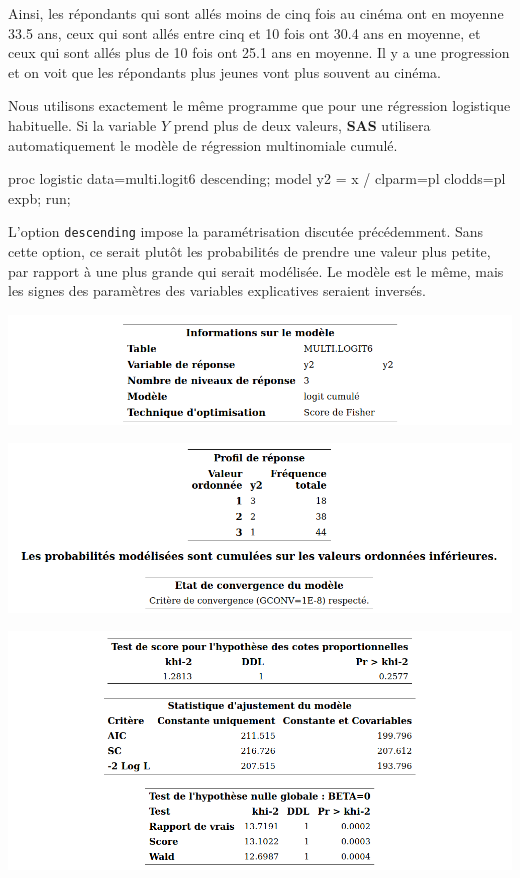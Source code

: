 \documentclass[
  11pt,
  letterpaper,
]{book}
\newenvironment{Shaded}{\begin{snugshade}}{\end{snugshade}}
\newcommand{\NormalTok}[1]{#1}
\theoremstyle{definition}
\theoremstyle{definition}
\theoremstyle{definition}
\theoremstyle{definition}
\theoremstyle{remark}
\begin{document}
Ainsi, les répondants qui sont allés moins de cinq fois au cinéma ont en moyenne 33.5 ans, ceux qui sont allés entre cinq et 10 fois ont 30.4 ans en moyenne, et ceux qui sont allés plus de 10 fois ont 25.1 ans en moyenne. Il y a une progression et on voit que les répondants plus jeunes vont plus souvent au cinéma.

Nous utilisons exactement le même programme que pour une régression logistique habituelle. Si la variable \(Y\) prend plus de deux valeurs, \textbf{SAS} utilisera automatiquement le modèle de régression multinomiale cumulé.

\begin{Shaded}
\begin{Highlighting}[]
\NormalTok{proc logistic data=multi.logit6 descending;}
\NormalTok{model y2 = x / clparm=pl clodds=pl expb;}
\NormalTok{run;}
\end{Highlighting}
\end{Shaded}

L'option \texttt{descending} impose la paramétrisation discutée précédemment. Sans cette option, ce serait plutôt les probabilités de prendre une valeur plus petite, par rapport à une plus grande qui serait modélisée. Le modèle est le même, mais les signes des paramètres des variables explicatives seraient inversés.

\begin{center}\includegraphics[width=0.8\linewidth]{figures/03-logistic-e26} \end{center}

\begin{center}\includegraphics[width=0.8\linewidth]{figures/03-logistic-e27} \end{center}

\begin{center}\includegraphics[width=0.8\linewidth]{figures/03-logistic-e28} \end{center}
\end{document}
